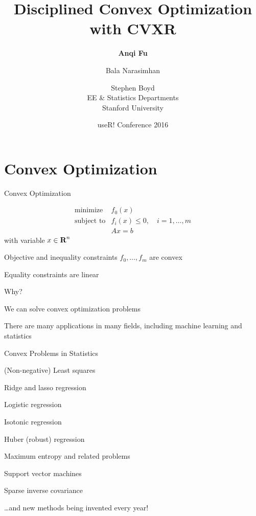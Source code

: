 \documentclass{beamer}
\title{Disciplined Convex Optimization with CVXR}
\author{\textbf{Anqi Fu} \and Bala Narasimhan \and Stephen Boyd \\[2ex]
	EE \& Statistics Departments\\[1ex]
	Stanford University}
\date{useR! Conference 2016}
\begin{document}
	
\begin{frame}
	\titlepage
\end{frame}

\begin{frame}
	\tableofcontents
\end{frame}

\section{Convex Optimization}

\begin{frame}{Convex Optimization}%
	
	\[
	\begin{array}{ll} \mbox{minimize} & f_0(x)\\
	\mbox{subject to} & f_i(x) \leq 0, \quad i=1, \ldots, m\\
	& Ax=b
	\end{array}
	\]
	with variable $x \in {\mbox{\bf R}}^n$
	
	\BIT
		\item Objective and inequality constraints $f_0, \ldots, f_m$ are convex %
		\item Equality constraints are linear
	\EIT
	\pause
	
	\vfill
	Why?
	\BIT
		\item We can solve convex optimization problems
		\item There are many applications in many fields, including machine learning and statistics
	\EIT
	
\end{frame}

\begin{frame}{Convex Problems in Statistics}
	\BIT
		\item (Non-negative) Least squares
		\item Ridge and lasso regression
		\item Logistic regression
		\item Isotonic regression
		\item Huber (robust) regression
		\item Maximum entropy and related problems
		\item Support vector machines
		\item Sparse inverse covariance
		\item \ldots and new methods being invented every year!
	\EIT
\end{frame}
\end{document}
